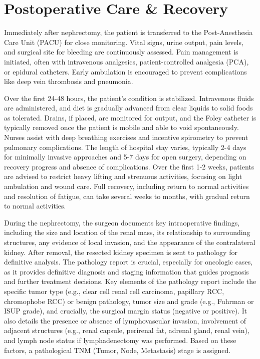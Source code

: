 \section*{Postoperative Care \& Recovery}
Immediately after nephrectomy, the patient is transferred to the Post-Anesthesia Care Unit (PACU) for close monitoring. Vital signs, urine output, pain levels, and surgical site for bleeding are continuously assessed. Pain management is initiated, often with intravenous analgesics, patient-controlled analgesia (PCA), or epidural catheters. Early ambulation is encouraged to prevent complications like deep vein thrombosis and pneumonia.

Over the first 24-48 hours, the patient's condition is stabilized. Intravenous fluids are administered, and diet is gradually advanced from clear liquids to solid foods as tolerated. Drains, if placed, are monitored for output, and the Foley catheter is typically removed once the patient is mobile and able to void spontaneously. Nurses assist with deep breathing exercises and incentive spirometry to prevent pulmonary complications. The length of hospital stay varies, typically 2-4 days for minimally invasive approaches and 5-7 days for open surgery, depending on recovery progress and absence of complications. Over the first 1-2 weeks, patients are advised to restrict heavy lifting and strenuous activities, focusing on light ambulation and wound care. Full recovery, including return to normal activities and resolution of fatigue, can take several weeks to months, with gradual return to normal activities.

During the nephrectomy, the surgeon documents key intraoperative findings, including the size and location of the renal mass, its relationship to surrounding structures, any evidence of local invasion, and the appearance of the contralateral kidney. After removal, the resected kidney specimen is sent to pathology for definitive analysis. The pathology report is crucial, especially for oncologic cases, as it provides definitive diagnosis and staging information that guides prognosis and further treatment decisions. Key elements of the pathology report include the specific tumor type (e.g., clear cell renal cell carcinoma, papillary RCC, chromophobe RCC) or benign pathology, tumor size and grade (e.g., Fuhrman or ISUP grade), and crucially, the surgical margin status (negative or positive). It also details the presence or absence of lymphovascular invasion, involvement of adjacent structures (e.g., renal capsule, perirenal fat, adrenal gland, renal vein), and lymph node status if lymphadenectomy was performed. Based on these factors, a pathological TNM (Tumor, Node, Metastasis) stage is assigned.

